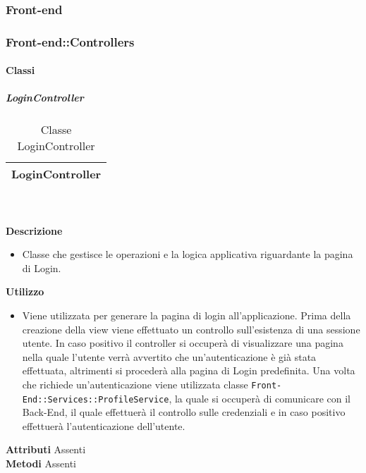 
	\subsubsection{Front-end} 
	\subsubsection{Front-end::Controllers} 
		\paragraph{Classi}
			\subparagraph{LoginController} 
\begin{table}[ht]
\begin{center}
\bgroup
	\setlength{\arrayrulewidth}{0.6mm}
	\def\arraystretch{1}
		\begin{tabular}{ | p{12cm} | }
				\hline  
					\centerline{\textbf{LoginController}}
		\\ \hline 
				\hline
				\hline
		
		\end{tabular}
\egroup
\caption{Classe LoginController}
\end{center}
\end{table} \textbf{\\ \\ Descrizione}
\begin{itemize}
\item[] Classe che gestisce le operazioni e la logica applicativa riguardante la pagina di Login.
\end{itemize} 
\textbf{Utilizzo}
\begin{itemize}
\item[] Viene utilizzata per generare la pagina di login all'applicazione. Prima della creazione della view viene effettuato un controllo sull'esistenza di una sessione utente. In caso positivo il controller si occuperà di visualizzare una pagina nella quale l'utente verrà avvertito che un'autenticazione è già stata effettuata, altrimenti si procederà alla pagina di Login predefinita. Una volta che richiede un'autenticazione viene utilizzata classe \texttt{Front-End::Services::ProfileService}, la quale si occuperà di comunicare con il Back-End, il quale effettuerà il controllo sulle credenziali e in caso positivo effettuerà l'autenticazione dell'utente.
\end{itemize}
\textbf{Attributi}
Assenti \\
\textbf{Metodi}
Assenti \\

